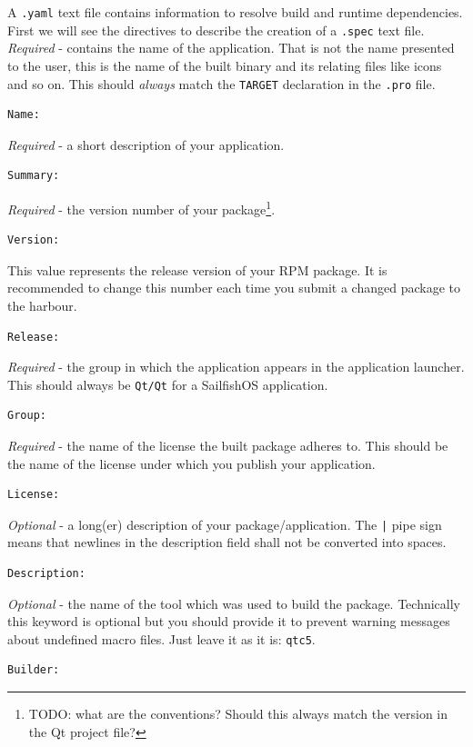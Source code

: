 %
A \verb,.yaml, text file contains information to resolve build and runtime dependencies. First we will see the directives to describe the creation of a \verb,.spec, text file.
%
\emph{Required} - contains the name of the application. That is not the name presented to the user, this is the name of the built binary and its relating files like icons and so on. This should \emph{always} match the \verb,TARGET, declaration in the \verb,.pro, file.
\begin{lstlisting}[language=tex]
Name:
\end{lstlisting}
%
%
\emph{Required} - a short description of your application.
\begin{lstlisting}[language=tex]
Summary:
\end{lstlisting}
%
%
\emph{Required} - the version number of your package\footnote{TODO: what are the conventions? Should this always match the version in the Qt project file?}.
\begin{lstlisting}[language=tex]
Version:
\end{lstlisting}
%
%
This value represents the release version of your RPM package. It is recommended to change this number each time you submit a changed package to the harbour.
\begin{lstlisting}[language=tex]
Release:
\end{lstlisting}
%
%
\emph{Required} - the group in which the application appears in the application launcher. This should always be \verb,Qt/Qt, for a SailfishOS application.
\begin{lstlisting}[language=tex]
Group:
\end{lstlisting}
%
%
\emph{Required} - the name of the license the built package adheres to. This should be the name of the license under which you publish your application.
\begin{lstlisting}[language=tex]
License:
\end{lstlisting}
%
%
\emph{Optional} - a long(er) description of your package/application. The \verb,|, pipe sign means that newlines in the description field shall not be converted into spaces.
\begin{lstlisting}[language=tex]
Description:
\end{lstlisting}
%
%
\emph{Optional} - the name of the tool which was used to build the package. Technically this keyword is optional but you should provide it to prevent warning messages about undefined macro files. Just leave it as it is: \verb,qtc5,.
\begin{lstlisting}[language=tex]
Builder:
\end{lstlisting}
